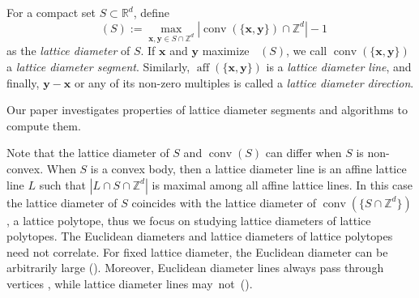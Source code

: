 \documentclass[11pt]{article}
\newcommand{\bx}{\mathbf{x}}
\newcommand{\by}{\mathbf{y}}
\newcommand{\R}{\mathbb{R}}
\newcommand{\Z}{\mathbb{Z}}
\DeclareMathOperator{\conv}{conv}
\DeclareMathOperator{\aff}{aff}
\DeclareMathOperator{\ldiam}{diam_\Z}
\begin{document}
\begin{definition}\label{def:ld-non-convex}
    For a compact set $S \subset \R^d$, define $$\ldiam(S):=\max_{\bx,\by \in S \cap \Z^d} |\conv(\{\bx,\by\}) \cap \Z^d|-1$$
    as the \emph{lattice diameter} of $S$. If $\bx$ and $\by$ maximize $\ldiam(S)$, we call $\conv(\{\bx,\by\})$ a \emph{lattice diameter segment}. Similarly, $\aff(\{\bx,\by\})$ is a \emph{lattice diameter line}, and finally, $\by-\bx$ or any of its non-zero multiples is called a \emph{lattice diameter direction}. 
\end{definition}

Our paper investigates properties of lattice diameter segments and algorithms to compute them.

Note that the lattice diameter of $S$ and $\conv(S)$ can differ when $S$ is non-convex. When $S$ is a convex body, then a lattice diameter line is an affine lattice line $L$ such that $|L \cap S \cap \Z^d|$ is maximal among all affine lattice lines. In this case the lattice diameter of $S$ coincides with the lattice diameter of $\conv(\{S \cap \Z^d\})$, a lattice polytope, thus we focus on studying lattice diameters of lattice polytopes. The Euclidean diameters and lattice diameters of lattice polytopes need not correlate. For fixed lattice diameter, the Euclidean diameter can be arbitrarily large (). Moreover, Euclidean diameter lines always pass through vertices \cite[Lemma~1.7]{GritzmannKlee1992}, while lattice diameter lines \mbox{may not ().}
\end{document}
